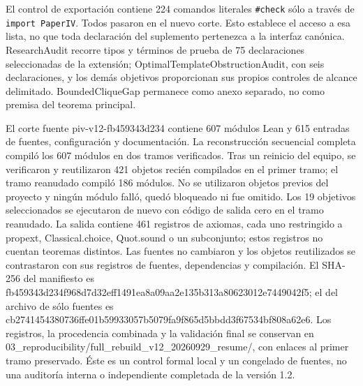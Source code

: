 \documentclass[spanish,11pt,a4paper]{article}
\begin{document}
El control de exportación contiene 224 comandos literales \nolinkurl{\#check} sólo a través de \texttt{import\ PaperIV}. Todos pasaron en el nuevo corte. Esto establece el acceso a esa lista, no que toda declaración del suplemento pertenezca a la interfaz canónica. ResearchAudit recorre tipos y términos de prueba de 75 declaraciones seleccionadas de la extensión; OptimalTemplateObstructionAudit, con seis declaraciones, y los demás objetivos proporcionan sus propios controles de alcance delimitado. BoundedCliqueGap permanece como anexo separado, no como premisa del teorema principal.

El corte fuente {\ttfamily\small piv-\discretionary{\hbox{\ensuremath{\hookrightarrow}}}{}{}v12-\discretionary{\hbox{\ensuremath{\hookrightarrow}}}{}{}fb459343d234} contiene 607 módulos Lean y 615 entradas de fuentes, configuración y documentación. La reconstrucción secuencial completa compiló los 607 módulos en dos tramos verificados. Tras un reinicio del equipo, se verificaron y reutilizaron 421 objetos recién compilados en el primer tramo; el tramo reanudado compiló 186 módulos. No se utilizaron objetos previos del proyecto y ningún módulo falló, quedó bloqueado ni fue omitido. Los 19 objetivos seleccionados se ejecutaron de nuevo con código de salida cero en el tramo reanudado. La salida contiene 461 registros de axiomas, cada uno restringido a {\ttfamily\small propext}, {\ttfamily\small Classical.\discretionary{\hbox{\ensuremath{\hookrightarrow}}}{}{}choice}, {\ttfamily\small Quot.\discretionary{\hbox{\ensuremath{\hookrightarrow}}}{}{}sound} o un subconjunto; estos registros no cuentan teoremas distintos. Las fuentes no cambiaron y los objetos reutilizados se contrastaron con sus registros de fuentes, dependencias y compilación. El SHA-256 del manifiesto es {\ttfamily\small fb459343d234\discretionary{\hbox{\ensuremath{\hookrightarrow}}}{}{}f968d7d32eff\discretionary{\hbox{\ensuremath{\hookrightarrow}}}{}{}1491ea8a09aa\discretionary{\hbox{\ensuremath{\hookrightarrow}}}{}{}2e135b313a80\discretionary{\hbox{\ensuremath{\hookrightarrow}}}{}{}623012e74490\discretionary{\hbox{\ensuremath{\hookrightarrow}}}{}{}42f5}; el del archivo de sólo fuentes es {\ttfamily\small cb2741454380\discretionary{\hbox{\ensuremath{\hookrightarrow}}}{}{}736ffe01b599\discretionary{\hbox{\ensuremath{\hookrightarrow}}}{}{}33057b5079fa\discretionary{\hbox{\ensuremath{\hookrightarrow}}}{}{}9f865d5bbdd3\discretionary{\hbox{\ensuremath{\hookrightarrow}}}{}{}f67534bf808a\discretionary{\hbox{\ensuremath{\hookrightarrow}}}{}{}62e6}. Los registros, la procedencia combinada y la validación final se conservan en {\ttfamily\small 03\_\discretionary{\hbox{\ensuremath{\hookrightarrow}}}{}{}reproducibil\discretionary{\hbox{\ensuremath{\hookrightarrow}}}{}{}ity/\discretionary{\hbox{\ensuremath{\hookrightarrow}}}{}{}full\_\discretionary{\hbox{\ensuremath{\hookrightarrow}}}{}{}rebuild\_\discretionary{\hbox{\ensuremath{\hookrightarrow}}}{}{}v12\_\discretionary{\hbox{\ensuremath{\hookrightarrow}}}{}{}20260929\_\discretionary{\hbox{\ensuremath{\hookrightarrow}}}{}{}resume/}, con enlaces al primer tramo preservado. Éste es un control formal local y un congelado de fuentes, no una auditoría interna o independiente completada de la versión 1.2.
\end{document}
